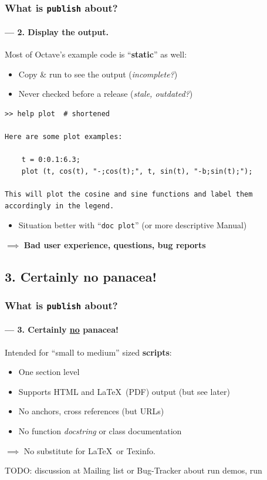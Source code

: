 \documentclass[xcolor=svgnames]{beamer}
\begin{document}
\begin{frame}[fragile]
\frametitle{What is \texttt{publish} about?}
\framesubtitle{--- 2. Display the output.}

Most of Octave's example code is ``\textbf{static}'' as well:
\begin{itemize}
\item Copy \& run to see the output (\textit{incomplete?})
\item Never checked before a release (\textit{stale, outdated?})
\end{itemize}

\begin{lstlisting}[language={}]
>> help plot  # shortened

Here are some plot examples:

    t = 0:0.1:6.3;
    plot (t, cos(t), "-;cos(t);", t, sin(t), "-b;sin(t);");

This will plot the cosine and sine functions and label them
accordingly in the legend.
\end{lstlisting}

\begin{itemize}
\item Situation better with ``\texttt{doc plot}'' (or more descriptive Manual)
\end{itemize}

$\implies$ \textbf{Bad user experience, questions, bug reports}
\end{frame}


\subsection{3. Certainly no panacea!}


\begin{frame}
\frametitle{What is \texttt{publish} about?}
\framesubtitle{--- 3. Certainly \underline{\textbf{no}} panacea!}

Intended for ``small to medium'' sized \textbf{scripts}:
\begin{itemize}\itemsep1em
\item One section level
\item Supports HTML and \LaTeX\ (PDF) output (but see later)
\item No anchors, cross references (but URLs)
\item No function \textit{docstring} or class documentation
\end{itemize}

\vfill

$\implies$ No substitute for \LaTeX\ or Texinfo.

TODO: discussion at Mailing list or Bug-Tracker about run demos, run
\end{frame}
\end{document}
